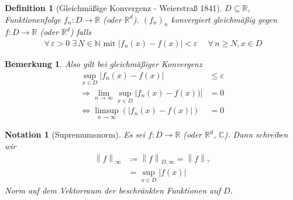 \documentclass[11pt, twoside, a4paper]{article}
\theoremstyle{plain}
\newtheorem{bemerkung}[blockelement]{Bemerkung}
\newtheorem{definition}[blockelement]{Definition}
\newtheorem{notation}[blockelement]{Notation}
\newcommand{\pair}[1]{\left(#1\right)}
\newcommand{\abs}[1]{\left\lvert#1\right\rvert}
\newcommand{\norm}[1]{\left\lVert#1\right\rVert}
\newcommand{\equivalent}[0]{\Leftrightarrow{}}
\newcommand{\impl}[0]{\Rightarrow{}}
\newcommand{\fromto}{\rightarrow{}}
\newcommand{\definedas}[0]{\coloneqq}
\newcommand{\sbset}{\subseteq}
\newcommand{\ntoinf}[0]{n\fromto\infty}
\newcommand{\fa}{\;\forall\,}
\newcommand{\ex}{\;\exists\,}
\newcommand{\R}{\mathbb{R}}
\newcommand{\N}{\mathbb{N}}
\newcommand{\C}{\mathbb{C}}
\begin{document}
    \begin{definition}[Gleichmäßige Konvergenz - Weierstraß 1841] %
        $D\sbset\R$, Funktionenfolge $f_n: D\fromto\R$ (oder $\R^d$). $(f_n)_n$ konvergiert gleichmäßig gegen $f: D\fromto\R$ (oder $\R^d$) falls
        \begin{align*}
            \fa\varepsilon > 0\ex N\in \N \text{ mit } \abs{f_n(x) - f(x)} < \varepsilon\quad\fa n\geq N, x\in D
        \end{align*}
    \end{definition}

    \begin{bemerkung}
        Also gilt bei gleichmäßiger Konvergenz
        \begin{align*}
            \sup_{x\in D} \abs{f_n(x) - f(x)} &\leq \varepsilon\\
            \impl \lim_{\ntoinf} \sup_{x\in D}\abs{f_n(x) - f(x))} &= 0\\
            \equivalent \limsup_{\ntoinf} \pair{\abs{f_n(x) - f(x)}} &= 0
        \end{align*}
    \end{bemerkung}


    \begin{notation}[Supremumsnorm]
        \marginnote{[01. Feb]}
        Es sei $f: D\fromto \R$ (oder $\R^d$, $\C$). Dann schreiben wir
        \begin{align*}
            \norm{f}_{\infty} &\definedas \norm{f}_{D,\infty} = \norm{f}_{?}\\
            &= \sup_{x\in D} \abs{f(x)}
        \end{align*}
        Norm auf dem Vektorraum der beschränkten Funktionen auf $D$.
    \end{notation}
\end{document}

